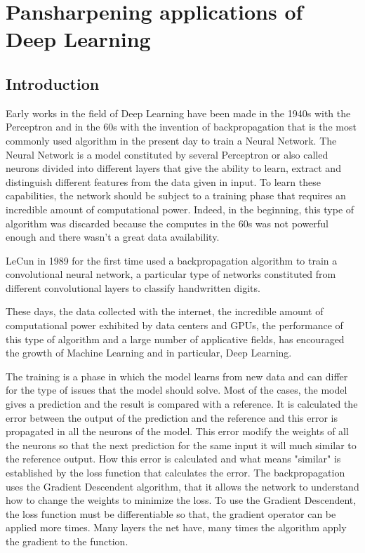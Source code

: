 \documentclass[12pt]{report}
\begin{document}
\newpage

\chapter{Pansharpening applications of Deep Learning}

\section{Introduction}

Early works in the field of Deep Learning have been made in the 1940s with the Perceptron \cite{perceptron} and in the 60s with the invention
of backpropagation that is the most commonly used algorithm in the present day to train a Neural Network.
The Neural Network is a model constituted by several Perceptron or also called neurons divided into different layers that give the 
ability to learn, extract and distinguish different features from the data given in input.
To learn these capabilities, the network should be subject to a training phase that requires an incredible amount of
computational power.
Indeed, in the beginning, this type of algorithm was discarded because the computes in the 60s was
not powerful enough and there wasn't a great data availability. 

LeCun in 1989 for the first time used a backpropagation algorithm to train a convolutional neural network, a particular
type of networks constituted from different convolutional layers to classify handwritten digits.

These days, the data collected with the internet, the incredible amount of computational power exhibited
by data centers and GPUs, the performance of this type of algorithm and a large number of applicative fields,
has encouraged the growth of Machine Learning and in particular, Deep Learning. 

The training is a phase in which the model learns from new data and can differ for the type of issues that the model should solve.
Most of the cases, the model gives a prediction and the result is compared with a reference. It is calculated the error between the
output of the prediction and the reference and this error is propagated in all the neurons of the model. 
This error modify the weights of all the neurons so that the next prediction for the same input it will much similar to the
reference output. 
How this error is calculated and what means "similar" is established by the loss function that calculates the error.
The backpropagation uses the Gradient Descendent algorithm, that it allows the network 
to understand how to change the weights to minimize the loss.
To use the Gradient Descendent, the loss function must be differentiable so that,
the gradient operator can be applied more times.
Many layers the net have, many times the algorithm apply the gradient to the function.
\end{document}
